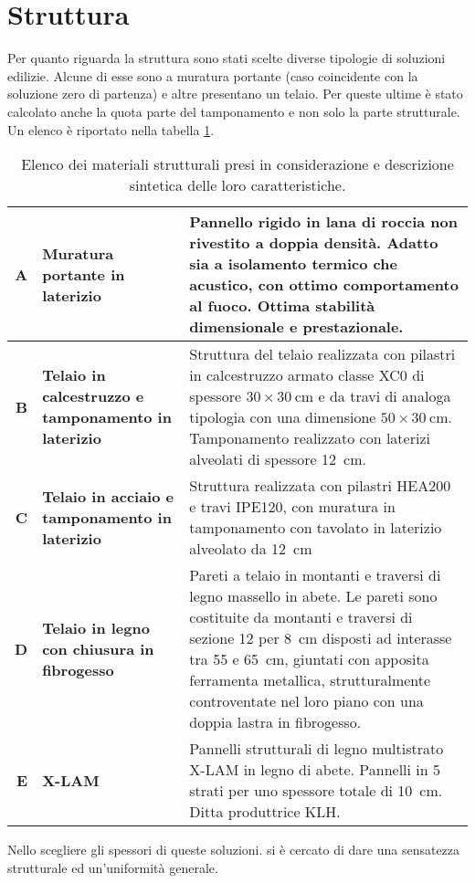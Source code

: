 \section{Struttura}
Per quanto riguarda la struttura sono stati scelte diverse tipologie di soluzioni edilizie. 
Alcune di esse sono a muratura portante (caso coincidente con la soluzione zero di partenza) e altre presentano un telaio. 
Per queste ultime è stato calcolato anche la quota parte del tamponamento e non solo la parte strutturale. 
Un elenco è riportato nella tabella \ref{MaterialiStruttura}.
\begin{table}[htbp]
\caption{Elenco dei materiali strutturali presi in considerazione e descrizione sintetica delle loro caratteristiche.}
\label{MaterialiStruttura}
\centering
\begin{tabularx}{\textwidth}{rXX}
    \toprule
        \textbf{A} & \textbf{Muratura portante in laterizio} & Pannello rigido in lana di roccia non rivestito a doppia densità. 
        Adatto sia a isolamento termico che acustico, con ottimo comportamento al fuoco. 
        Ottima stabilità dimensionale e prestazionale. \\\midrule
        \textbf{B} & \textbf{Telaio in calcestruzzo e tamponamento in laterizio} & Struttura del telaio realizzata con pilastri in calcestruzzo armato classe XC0 di spessore $30\times\SI{30}{\centi\meter}$ e da travi di analoga tipologia con una dimensione $50\times\SI{30}{\centi\meter}$. Tamponamento realizzato con laterizi alveolati di spessore \SI{12}{\centi\meter}. \\\midrule
        \textbf{C} & \textbf{Telaio in acciaio e tamponamento in laterizio} & Struttura realizzata con pilastri HEA200 e travi IPE120, con muratura in tamponamento con tavolato in laterizio alveolato da \SI{12}{\centi\meter}\\\midrule
        \textbf{D} & \textbf{Telaio in legno con chiusura in fibrogesso} & Pareti a telaio in montanti e traversi di legno massello in abete. Le pareti sono costituite da montanti e traversi di sezione 12 per \SI{8}{\centi\meter} disposti ad interasse tra 55 e \SI{65}{\centi\meter}, giuntati con apposita ferramenta metallica, strutturalmente controventate nel loro piano con una doppia lastra in fibrogesso. \\\midrule
        \textbf{E} & \textbf{X-LAM} & Pannelli strutturali di legno multistrato X-LAM in legno di abete. Pannelli in 5 strati per uno spessore totale di \SI{10}{\centi\meter}. Ditta produttrice KLH.\\
    \bottomrule
\end{tabularx}
\end{table}
Nello scegliere gli spessori di queste soluzioni. si è cercato di dare una sensatezza strutturale ed un'uniformità generale.


